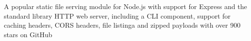 \begin{project}

  A popular static file serving module for Node.js with support for Express and
  the standard library HTTP web server, including a CLI component, support for
  caching headers, CORS headers, file listinga and zipped payloads with over 900
  stars on GitHub
\end{project}
